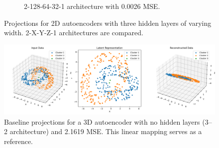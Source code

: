 \begin{figure}[htb]
\begin{subfigure}[b]{0.49\textwidth}
    \caption{2-128-64-32-1 architecture with \textcolor{green!20!black}{0.0026} MSE.}
    \label{fig:2-128-64-32-1}
  \end{subfigure}

  \caption{Projections for 2D autoencoders with three hidden layers of varying width. 2-X-Y-Z-1 architectures are compared.}
  \label{fig:2-X-Y-Z-1}
\end{figure}

\begin{figure}[htb]
    \centering
    \includegraphics[width=\linewidth]{images/RQ1/3-2_2.1619.png}
    \caption{Baseline projections for a 3D autoencoder with no hidden layers (3–2 architecture) and \textcolor{red!40!black}{2.1619} MSE. This linear mapping serves as a reference.}
    \label{fig:3-2}
\end{figure}

